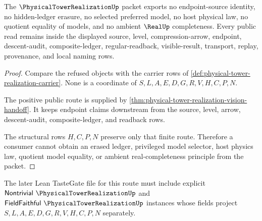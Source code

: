 \begin{theorem}
\label{thm:physical-tower-realization-nonescape}
The $\PhysicalTowerRealizationUp$ packet exports no endpoint-source identity, no hidden-ledger erasure, no selected preferred model, no host physical law, no quotient equality of models, and no ambient $\RealUp$ completeness. Every public read remains inside the displayed source, level, compression-arrow, endpoint, descent-audit, composite-ledger, regular-readback, visible-result, transport, replay, provenance, and local naming rows.
\end{theorem}
\begin{proof}
Compare the refused objects with the carrier rows of \autoref{def:physical-tower-realization-carrier}. None is a coordinate of $S,L,A,E,D,G,R,V,H,C,P,N$.

The positive public route is supplied by \autoref{thm:physical-tower-realization-vision-handoff}. It keeps endpoint claims downstream from the source, level, arrow, descent-audit, composite-ledger, and readback rows.

The structural rows $H,C,P,N$ preserve only that finite route. Therefore a consumer cannot obtain an erased ledger, privileged model selector, host physics law, quotient model equality, or ambient real-completeness principle from the packet.
\end{proof}



The later Lean TasteGate file for this route must include explicit $\mathsf{Nontrivial}\ \PhysicalTowerRealizationUp$ and $\mathsf{FieldFaithful}\ \PhysicalTowerRealizationUp$ instances whose fields project $S,L,A,E,D,G,R,V,H,C,P,N$ separately.

